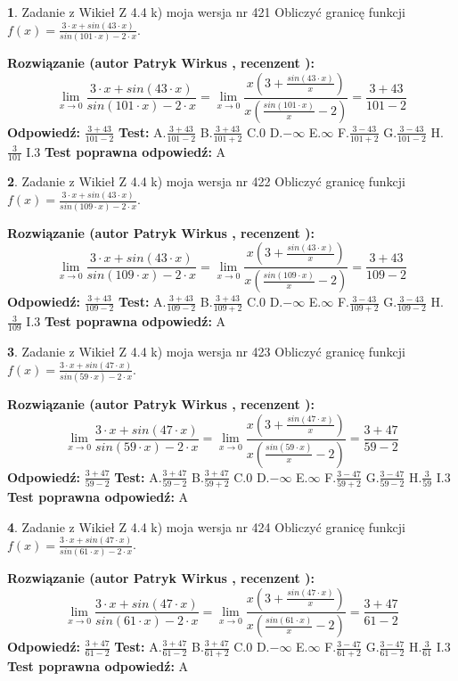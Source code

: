 \documentclass[12pt, a4paper]{article}
\theoremstyle{definition} %
\newtheorem{zad}{}
\newcommand{\zadStart}[1]{\begin{zad}#1\newline}
\newcommand{\zadStop}{\end{zad}}
\newcommand{\rozwStart}[2]{\noindent \textbf{Rozwiązanie (autor #1 , recenzent #2): }\newline}
\newcommand{\rozwStop}{\newline}
\newcommand{\odpStart}{\noindent \textbf{Odpowiedź:}\newline}
\newcommand{\odpStop}{\newline}
\newcommand{\testStart}{\noindent \textbf{Test:}\newline}
\newcommand{\testStop}{\newline}
\newcommand{\kluczStart}{\noindent \textbf{Test poprawna odpowiedź:}\newline}
\newcommand{\kluczStop}{\newline}
\begin{document}
\zadStart{Zadanie z Wikieł Z 4.4 k) moja wersja nr 421}
Obliczyć granicę funkcji $f(x)=\frac{3\cdot x +sin(43\cdot x)}{sin(101\cdot x) -2\cdot x}$.
\zadStop
\rozwStart{Patryk Wirkus}{}
$$\lim\limits_{x\to 0}\frac{3\cdot x +sin(43\cdot x)}{sin(101\cdot x) -2\cdot x}
=\lim\limits_{x\to 0}\frac{x(3+\frac{sin(43\cdot x)}{x})}{x(\frac{sin(101\cdot x)}{x}-2)}
=\frac{3+43}{101-2}$$
\rozwStop
\odpStart
$\frac{3+43}{101-2}$
\odpStop
\testStart
A.$\frac{3+43}{101-2}$
B.$\frac{3+43}{101+2}$
C.$0$
D.$-\infty$
E.$\infty$
F.$\frac{3-43}{101+2}$
G.$\frac{3-43}{101-2}$
H.$\frac{3}{101}$
I.$3$
\testStop
\kluczStart
A
\kluczStop



\zadStart{Zadanie z Wikieł Z 4.4 k) moja wersja nr 422}
Obliczyć granicę funkcji $f(x)=\frac{3\cdot x +sin(43\cdot x)}{sin(109\cdot x) -2\cdot x}$.
\zadStop
\rozwStart{Patryk Wirkus}{}
$$\lim\limits_{x\to 0}\frac{3\cdot x +sin(43\cdot x)}{sin(109\cdot x) -2\cdot x}
=\lim\limits_{x\to 0}\frac{x(3+\frac{sin(43\cdot x)}{x})}{x(\frac{sin(109\cdot x)}{x}-2)}
=\frac{3+43}{109-2}$$
\rozwStop
\odpStart
$\frac{3+43}{109-2}$
\odpStop
\testStart
A.$\frac{3+43}{109-2}$
B.$\frac{3+43}{109+2}$
C.$0$
D.$-\infty$
E.$\infty$
F.$\frac{3-43}{109+2}$
G.$\frac{3-43}{109-2}$
H.$\frac{3}{109}$
I.$3$
\testStop
\kluczStart
A
\kluczStop



\zadStart{Zadanie z Wikieł Z 4.4 k) moja wersja nr 423}
Obliczyć granicę funkcji $f(x)=\frac{3\cdot x +sin(47\cdot x)}{sin(59\cdot x) -2\cdot x}$.
\zadStop
\rozwStart{Patryk Wirkus}{}
$$\lim\limits_{x\to 0}\frac{3\cdot x +sin(47\cdot x)}{sin(59\cdot x) -2\cdot x}
=\lim\limits_{x\to 0}\frac{x(3+\frac{sin(47\cdot x)}{x})}{x(\frac{sin(59\cdot x)}{x}-2)}
=\frac{3+47}{59-2}$$
\rozwStop
\odpStart
$\frac{3+47}{59-2}$
\odpStop
\testStart
A.$\frac{3+47}{59-2}$
B.$\frac{3+47}{59+2}$
C.$0$
D.$-\infty$
E.$\infty$
F.$\frac{3-47}{59+2}$
G.$\frac{3-47}{59-2}$
H.$\frac{3}{59}$
I.$3$
\testStop
\kluczStart
A
\kluczStop



\zadStart{Zadanie z Wikieł Z 4.4 k) moja wersja nr 424}
Obliczyć granicę funkcji $f(x)=\frac{3\cdot x +sin(47\cdot x)}{sin(61\cdot x) -2\cdot x}$.
\zadStop
\rozwStart{Patryk Wirkus}{}
$$\lim\limits_{x\to 0}\frac{3\cdot x +sin(47\cdot x)}{sin(61\cdot x) -2\cdot x}
=\lim\limits_{x\to 0}\frac{x(3+\frac{sin(47\cdot x)}{x})}{x(\frac{sin(61\cdot x)}{x}-2)}
=\frac{3+47}{61-2}$$
\rozwStop
\odpStart
$\frac{3+47}{61-2}$
\odpStop
\testStart
A.$\frac{3+47}{61-2}$
B.$\frac{3+47}{61+2}$
C.$0$
D.$-\infty$
E.$\infty$
F.$\frac{3-47}{61+2}$
G.$\frac{3-47}{61-2}$
H.$\frac{3}{61}$
I.$3$
\testStop
\kluczStart
A
\kluczStop
\end{document}

